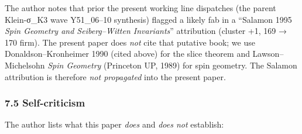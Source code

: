 \documentclass[
 11pt,
 a4paper,
]{article}
\begin{document}
The author notes that prior the present working line dispatches (the parent Klein-σ\_K3 wave Y51\_06--10 synthesis) flagged a likely fab in a ``Salamon 1995 \emph{Spin Geometry and Seiberg--Witten Invariants}'' attribution (cluster +1, 169 → 170 firm). The present paper does \emph{not} cite that putative book; we use Donaldson--Kronheimer 1990 (cited above) for the slice theorem and Lawson--Michelsohn \emph{Spin Geometry} (Princeton UP, 1989) for spin geometry. The Salamon attribution is therefore \emph{not propagated} into the present paper.

\hypertarget{self-criticism}{%
\subsubsection{7.5 Self-criticism}\label{self-criticism}}

The author lists what this paper \emph{does} and \emph{does not} establish:
\end{document}
